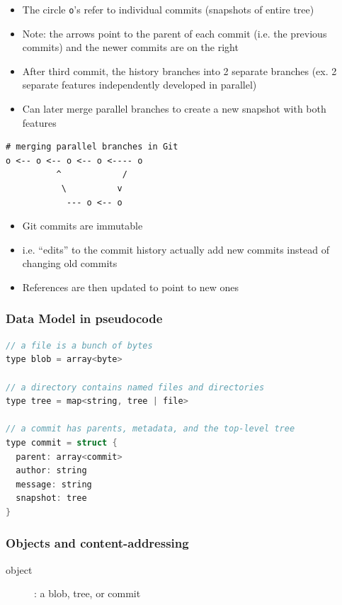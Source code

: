 \documentclass[letterpaper,12pt]{article}
\begin{document}
\begin{itemize}
 \item The circle \lstinline{o}'s refer to individual commits (snapshots of entire tree)
 \item Note: the arrows point to the parent of each commit (i.e. the previous commits) and the newer commits are on the right
 \item After third commit, the history branches into 2 separate branches (ex. 2 separate features independently developed in parallel)
 \item Can later merge parallel branches to create a new snapshot with both features
\end{itemize}

\begin{lstlisting}
# merging parallel branches in Git
o <-- o <-- o <-- o <---- o
          ^            /
           \          v
            --- o <-- o
\end{lstlisting}

\begin{itemize}
 \item Git commits are immutable
 \item i.e. ``edits'' to the commit history actually add new commits instead of changing old commits
 \item References are then updated to point to new ones
\end{itemize}


\subsubsection{Data Model in pseudocode}

\begin{lstlisting}[language=c++]
// a file is a bunch of bytes
type blob = array<byte>

// a directory contains named files and directories
type tree = map<string, tree | file>

// a commit has parents, metadata, and the top-level tree
type commit = struct {
  parent: array<commit>
  author: string
  message: string
  snapshot: tree
}
\end{lstlisting}


\subsubsection{Objects and content-addressing}
\begin{description}
 \item[object]: a blob, tree, or commit
\end{description}
\end{document}
